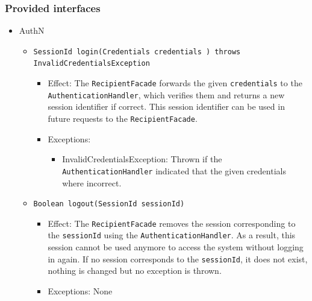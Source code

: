 \documentclass[a4paper,10pt]{article}
\begin{document}
\subsubsection*{Provided interfaces}
\begin{itemize}
    \item AuthN
    \begin{itemize}
        \item \texttt{SessionId login(Credentials credentials ) throws InvalidCredentialsException}
        \begin{itemize}
            \item Effect: The \texttt{RecipientFacade} forwards the given \texttt{credentials} to the \texttt{AuthenticationHandler}, which verifies them and returns a new session identifier if correct. This session identifier can be used in future requests to the \texttt{RecipientFacade}.
            \item Exceptions:
            \begin{itemize}
                \item InvalidCredentialsException: Thrown if the \texttt{AuthenticationHandler} indicated that the given credentials where incorrect.
            \end{itemize}
		\end{itemize}
		
        \item \texttt{Boolean logout(SessionId sessionId)}
            \begin{itemize}
                \item Effect: The \texttt{RecipientFacade} removes the session corresponding to the \texttt{sessionId} using the \texttt{AuthenticationHandler}. As a result, this session cannot be used anymore to access the system without logging in again. If no session corresponds to the \texttt{sessionId}, it does not exist, nothing is changed but no exception is thrown.
                \item Exceptions: None
            \end{itemize}
        \end{itemize}
    


\end{itemize}
\end{document}
